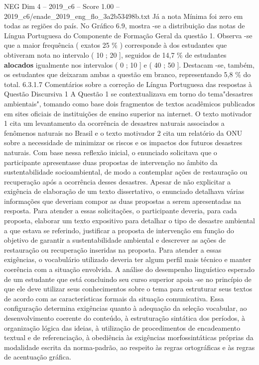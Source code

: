 \begin{textsample}{NEG Dim 4 – 2019\_c6 – Score 1.00 – 2019\_c6/enade\_2019\_eng\_flo\_3a2b53498b.txt}
Já a nota Mínima foi zero em todas as regiões do país.
No Gráfico 6.9, mostra -se a distribuição das notas de Língua Portuguesa do Componente de Formação Geral da questão 1.
Observa -se que a maior frequência ( exatos 25 \% ) corresponde à dos estudantes que obtiveram nota no intervalo ( 10 ; 20 ], seguidos de 14,7 \% de estudantes \textbf{alocados} igualmente nos intervalos ( 0 ; 10 ] e ( 40 ; 50 ].
Destacam -se, também, os estudantes que deixaram ambas a questão em branco, representando 5,8 \% do total. 6.3.1.7 Comentários sobre a correção de Língua Portuguesa das respostas à Questão Discursiva 1 A Questão 1 se contextualizava em torno do tema"desastres ambientais", tomando como base dois fragmentos de textos acadêmicos publicados em sites oficiais de instituições de ensino superior na internet.
O texto motivador 1 cita um levantamento da ocorrência de desastres naturais associados a fenômenos naturais no Brasil e o texto motivador 2 cita um relatório da ONU sobre a necessidade de minimizar os riscos e os impactos dos futuros desastres naturais.
Com base nessa reflexão inicial, o enunciado solicitava que o participante apresentasse duas propostas de intervenção no âmbito da sustentabilidade socioambiental, de modo a contemplar ações de restauração ou recuperação após a ocorrência desses desastres.
Apesar de não explicitar a exigência de elaboração de um texto dissertativo, o enunciado detalhava várias informações que deveriam compor as duas propostas a serem apresentadas na resposta.
Para atender a essas solicitações, o participante deveria, para cada proposta, elaborar um texto expositivo para detalhar o tipo de desastre ambiental a que estava se referindo, justificar a proposta de intervenção em função do objetivo de garantir a sustentabilidade ambiental e descrever as ações de restauração ou recuperação inseridas na proposta.
Para atender a essas exigências, o vocabulário utilizado deveria ter algum perfil mais técnico e manter coerência com a situação envolvida.
A análise do desempenho linguístico esperado de um estudante que está concluindo seu curso superior apoia -se no princípio de que ele deve utilizar seus conhecimentos sobre o tema para estruturar seus textos de acordo com as características formais da situação comunicativa.
Essa configuração determina exigências quanto à adequação da seleção vocabular, ao desenvolvimento coerente do conteúdo, à estruturação sintática dos períodos, à organização lógica das ideias, à utilização de procedimentos de encadeamento textual e de referenciação, à obediência às exigências morfossintáticas próprias da modalidade escrita da norma-padrão, ao respeito às regras ortográficas e às regras de acentuação gráfica.

\end{textsample}
